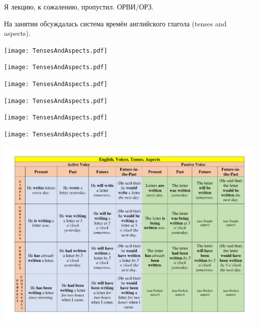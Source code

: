 \documentclass[main.tex]{subfiles}
\begin{document}

Я лекцию, к сожалению, пропустил. ОРВИ/ОРЗ.

На занятии обсуждалась система времён английского глагола (tenses and aspects).

\label{subsec:tenses-usage}
\vspace{-10mm}
{\parindent-20pt\texttt{[image: TensesAndAspects.pdf]}}\newpage

\vspace{-5mm}
{\parindent-20pt\texttt{[image: TensesAndAspects.pdf]}}\newpage

\vspace{-5mm}
{\parindent-20pt\texttt{[image: TensesAndAspects.pdf]}}\newpage

\vspace{-5mm}
{\parindent-20pt\texttt{[image: TensesAndAspects.pdf]}}\newpage

\vspace{-5mm}
{\parindent-20pt\texttt{[image: TensesAndAspects.pdf]}}\newpage

{\parindent-20pt\texttt{[image: TensesAndAspects.pdf]}}

\label{subsec:tenses-aspects-full-table-local}

{\parindent0pt\includegraphics[width=\textwidth,page=1,trim={0.5in 0in 0.49in 0in},clip=true]{EnglishTensesAspectsVoicesPoster.pdf}}
\end{document}
